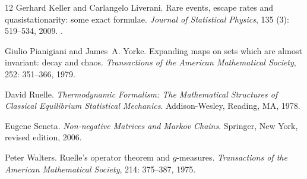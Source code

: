 \documentclass[10pt,a4paper]{article}
\theoremstyle{plain}
\theoremstyle{definition}
\theoremstyle{remark}
\begin{document}
\begin{thebibliography}{12}
Gerhard Keller and Carlangelo Liverani.
\newblock Rare events, escape rates and quasistationarity: some exact formulae.
\newblock \emph{Journal of Statistical Physics}, 135 (3):
  519--534, 2009.
\newblock {}.

Giulio Pianigiani and James~A. Yorke.
\newblock Expanding maps on sets which are almost invariant: decay and chaos.
\newblock \emph{Transactions of the American Mathematical Society},
  252: 351--366, 1979.

David Ruelle.
\newblock \emph{Thermodynamic Formalism: The Mathematical Structures of
  Classical Equilibrium Statistical Mechanics}.
\newblock Addison-Wesley, Reading, MA, 1978.

Eugene Seneta.
\newblock \emph{Non-negative Matrices and Markov Chains}.
\newblock Springer, New York, revised edition, 2006.

Peter Walters.
\newblock Ruelle's operator theorem and {$g$}-measures.
\newblock \emph{Transactions of the American Mathematical Society},
  214: 375--387, 1975.

\end{thebibliography}
\end{document}
